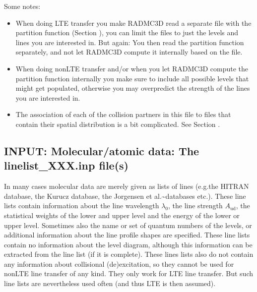 \documentclass[letterpaper,10pt,english]{sphinxmanual}
\begin{document}
Some notes:
\begin{itemize}
\item {} 
When doing LTE transfer  you make RADMC\sphinxhyphen{}3D read a separate
file with the partition function (Section {\hyperref[\detokenize{lineradtrans:sec-partition-function}]{}}),
you can limit the  files to just the levels
and lines you are interested in. But again: You  then read the
partition function separately, and not let RADMC\sphinxhyphen{}3D compute it internally
based on the  file.

\item {} 
When doing non\sphinxhyphen{}LTE transfer and/or when you let RADMC\sphinxhyphen{}3D compute the
partition function internally you  make sure to include all
possible levels that might get populated, otherwise you may overpredict
the strength of the lines you are interested in.

\item {} 
The association of each of the collision partners in this file to
files that contain their spatial distribution is a bit complicated. See
Section {\hyperref[\detokenize{lineradtrans:sec-collpartner}]{}}.

\end{itemize}


\subsection{INPUT: Molecular/atomic data: The linelist\_XXX.inp file(s)}
\label{\detokenize{lineradtrans:input-molecular-atomic-data-the-linelist-xxx-inp-file-s}}\label{\detokenize{lineradtrans:sec-linelist-xxx-inp}}
In many cases molecular data are merely given as lists of lines (e.g.the
HITRAN database, the Kurucz database, the Jorgensen et al.\textasciitilde{}databases
etc.). These line lists contain information about the line wavelength
\(\lambda_0\), the line strength \(A_{\mathrm{ud}}\), the statistical
weights of the lower and upper level and the energy of the lower or upper
level. Sometimes also the name or set of quantum numbers of the levels, or
additional information about the line profile shapes are specified. These line
lists contain no  information about the level diagram, although this
information can be extracted from the line list (if it is complete). These lines
lists also do not contain any information about collisional (de\sphinxhyphen{})excitation, so
they cannot be used for non\sphinxhyphen{}LTE line transfer of any kind. They only work for
LTE line transfer. But such line lists are nevertheless used often (and thus LTE
is then assumed).
\end{document}
